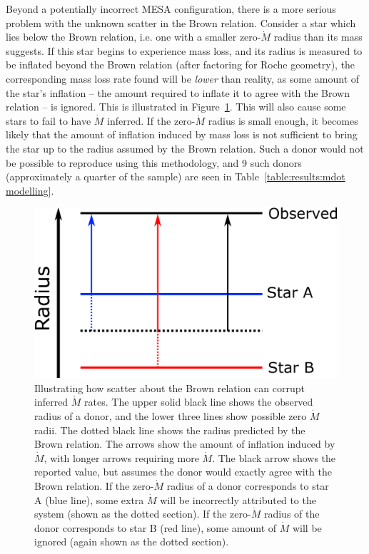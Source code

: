 Beyond a potentially incorrect MESA configuration, there is a more serious problem with the unknown scatter in the Brown relation.
Consider a star which lies below the Brown relation, i.e. one with a smaller zero-$\dot M$ radius than its mass suggests. If this star begins to experience mass loss, and its radius is measured to be inflated beyond the Brown relation (after factoring for Roche geometry), the corresponding mass loss rate found will be \textit{lower} than reality, as some amount of the star's inflation -- the amount required to inflate it to agree with the Brown relation -- is ignored.
This is illustrated in Figure~\ref{fig:massloss and AML:brown scatter causes bias}.
This will also cause some stars to fail to have $\dot M$ inferred. If the zero-$\dot M$ radius is small enough, it becomes likely that the amount of inflation induced by mass loss is not sufficient to bring the star up to the radius assumed by the Brown relation. Such a donor would not be possible to reproduce using this methodology, and 9 such donors (approximately a quarter of the sample) are seen in Table~\ref{table:results:mdot modelling}.
\begin{figure}
    \centering
    \includegraphics[width=.7\textwidth]{figures/results/brown_scatter_causes_bias.png}
    \caption{Illustrating how scatter about the Brown relation can corrupt inferred $\dot M$ rates. The upper solid black line shows the observed radius of a donor, and the lower three lines show possible zero $\dot M$ radii. The dotted black line shows the radius predicted by the Brown relation. The arrows show the amount of inflation induced by $\dot M$, with longer arrows requiring more $\dot M$. The black arrow shows the reported value, but assumes the donor would exactly agree with the Brown relation. If the zero-$\dot M$ radius of a donor corresponds to star A (blue line), some extra $\dot M$ will be incorrectly attributed to the system (shown as the dotted section). If the zero-$\dot M$ radius of the donor corresponds to star B (red line), some amount of $\dot M$ will be ignored (again shown as the dotted section).}
    \label{fig:massloss and AML:brown scatter causes bias}
\end{figure}

